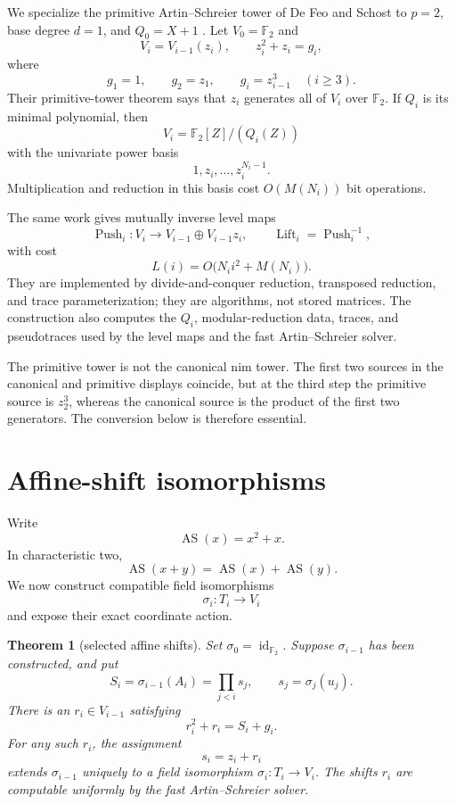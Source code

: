 \documentclass[11pt]{article}
\newtheorem{theorem}{Theorem}[section]
\theoremstyle{definition}
\theoremstyle{remark}
\newcommand{\F}{\mathbb F}
\newcommand{\AS}{\operatorname{AS}}
\newcommand{\Push}{\operatorname{Push}}
\newcommand{\Lift}{\operatorname{Lift}}
\begin{document}
We specialize the primitive Artin--Schreier tower of De Feo and Schost to
$p=2$, base degree $d=1$, and $Q_0=X+1$
\cite{defeoschost2012}.  Let $V_0=\F_2$ and
\[
  V_i=V_{i-1}(z_i),
  \qquad
  z_i^2+z_i=g_i,
\]
where
\begin{equation}
  g_1=1,
  \qquad
  g_2=z_1,
  \qquad
  g_i=z_{i-1}^3\quad(i\geq3).
\end{equation}
Their primitive-tower theorem says that $z_i$ generates all of $V_i$ over
$\F_2$.  If $Q_i$ is its minimal polynomial, then
\[
  V_i=\F_2[Z]/(Q_i(Z))
\]
with the univariate power basis
\[
  1,z_i,\ldots,z_i^{N_i-1}.
\]
Multiplication and reduction in this basis cost $O(M(N_i))$ bit operations.

The same work gives mutually inverse level maps
\[
  \Push_i:V_i\longrightarrow V_{i-1}\oplus V_{i-1}z_i,
  \qquad
  \Lift_i=\Push_i^{-1},
\]
with cost
\begin{equation}
  L(i)=O\bigl(N_i i^2+M(N_i)\bigr).
\end{equation}
They are implemented by divide-and-conquer reduction, transposed reduction,
and trace parameterization; they are algorithms, not stored matrices.  The
construction also computes the $Q_i$, modular-reduction data, traces, and
pseudotraces used by the level maps and the fast Artin--Schreier solver.

The primitive tower is not the canonical nim tower.  The first two sources in
the canonical and primitive displays
coincide, but at the third step the primitive source is $z_2^3$, whereas the
canonical source is the product of the first two generators.  The conversion
below is therefore essential.

\section{Affine-shift isomorphisms}

Write
\[
  \AS(x)=x^2+x.
\]
In characteristic two,
\begin{equation}
  \AS(x+y)=\AS(x)+\AS(y).
\end{equation}
We now construct compatible field isomorphisms
\[
  \sigma_i:T_i\longrightarrow V_i
\]
and expose their exact coordinate action.

\begin{theorem}[selected affine shifts]\label{thm:shifts}
Set $\sigma_0=\operatorname{id}_{\F_2}$.  Suppose $\sigma_{i-1}$ has been
constructed, and put
\[
  S_i=\sigma_{i-1}(A_i)
      =\prod_{j<i}s_j,
  \qquad
  s_j=\sigma_j(u_j).
\]
There is an $r_i\in V_{i-1}$ satisfying
\begin{equation}
  r_i^2+r_i=S_i+g_i.
\end{equation}
For any such $r_i$, the assignment
\begin{equation}
  s_i=z_i+r_i
\end{equation}
extends $\sigma_{i-1}$ uniquely to a field isomorphism $\sigma_i:T_i\to V_i$.
The shifts $r_i$ are computable uniformly by the fast Artin--Schreier solver.
\end{theorem}
\end{document}
